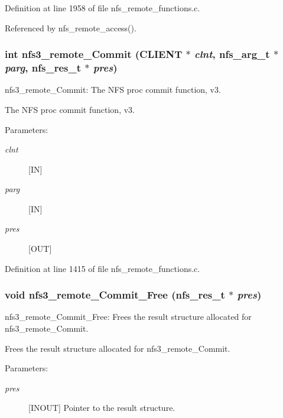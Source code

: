 Definition at line 1958 of file nfs\_\-remote\_\-functions.c.

Referenced by nfs\_\-remote\_\-access().
\subsubsection{\setlength{\rightskip}{0pt plus 5cm}int nfs3\_\-remote\_\-Commit (CLIENT $\ast$ {\em clnt}, nfs\_\-arg\_\-t $\ast$ {\em parg}, nfs\_\-res\_\-t $\ast$ {\em pres})}\label{group__NFSprocs_ga38}


nfs3\_\-remote\_\-Commit: The NFS proc commit function, v3.

The NFS proc commit function, v3.

\begin{Desc}
\item[Parameters:]
\begin{description}
\item[{\em clnt}][IN] \item[{\em parg}][IN] \item[{\em pres}][OUT] \end{description}
\end{Desc}


Definition at line 1415 of file nfs\_\-remote\_\-functions.c.
\subsubsection{\setlength{\rightskip}{0pt plus 5cm}void nfs3\_\-remote\_\-Commit\_\-Free (nfs\_\-res\_\-t $\ast$ {\em pres})}\label{group__NFSprocs_ga92}


nfs3\_\-remote\_\-Commit\_\-Free: Frees the result structure allocated for nfs3\_\-remote\_\-Commit.

Frees the result structure allocated for nfs3\_\-remote\_\-Commit.

\begin{Desc}
\item[Parameters:]
\begin{description}
\item[{\em pres}][INOUT] Pointer to the result structure. \end{description}
\end{Desc}



